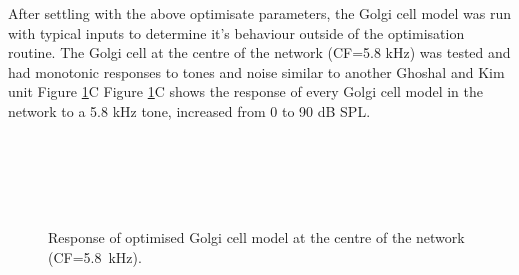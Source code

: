 After settling with the above optimisate parameters, the Golgi cell model was
run with typical inputs to determine it's behaviour outside of the optimisation
routine.  The Golgi cell at the centre of the network (CF=5.8 kHz) was tested
and had monotonic responses to tones and noise similar to another Ghoshal and
Kim unit Figure \ref{fig:Golgi_verification}C Figure
\ref{fig:Golgi_verification}C shows the response of every Golgi cell model in
the network to a 5.8 kHz tone, increased from 0 to 90 dB SPL.
\begin{figure}[h]
  \centering
  \hspace{0.5\textwidth}\hfill\\
  \\
  \hfill\\
  \\
 \label{fig:Golgi_verification}
 \caption{Response of optimised Golgi cell model at the centre of the network (CF=5.8~kHz).}
\end{figure}





